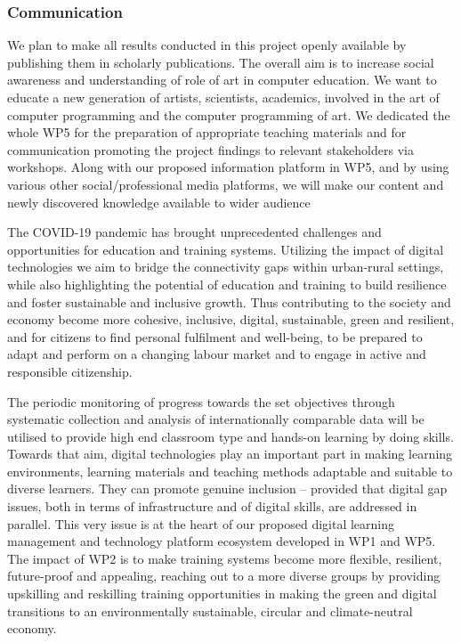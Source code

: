 \subsubsection{Communication}
We plan to make all results conducted in this project openly available by publishing them in scholarly publications. The overall aim is to increase social awareness and understanding of role of art in computer education. We want to educate a new generation of artists, scientists, academics, involved in the art of computer programming and the computer programming of art. We dedicated the whole WP5 for the preparation of appropriate teaching materials and for communication promoting the project findings to relevant stakeholders via workshops. Along with our proposed information platform in WP5, and by using various other social/professional media platforms, we will make our content and newly discovered knowledge available to wider audience

The COVID-19 pandemic has brought unprecedented challenges and opportunities for education and training systems. Utilizing the impact of digital technologies we aim to bridge the connectivity gaps within urban-rural settings, while also highlighting the potential of education and training to build resilience and foster sustainable and inclusive growth. Thus contributing to the society and economy become more cohesive, inclusive, digital, sustainable, green and resilient, and for citizens to find personal fulfilment and well-being, to be prepared to adapt and perform on a changing labour market and to engage in active and responsible citizenship.

The periodic monitoring of progress towards the set objectives through systematic collection and analysis of internationally comparable data will be utilised to provide high end classroom type and hands-on learning by doing skills. Towards that aim, digital technologies play an important part in making learning environments, learning materials and teaching methods adaptable and suitable to diverse learners. They can promote genuine inclusion – provided that digital gap issues, both in terms of infrastructure and of digital skills, are addressed in parallel. This very issue is at the heart of our proposed digital learning management and technology platform ecosystem developed in WP1 and WP5. The impact of WP2 is to make training systems become more flexible, resilient, future-proof and appealing, reaching out to a more diverse groups by providing upskilling and reskilling training opportunities in making the green and digital transitions to an environmentally sustainable, circular and climate-neutral economy.


